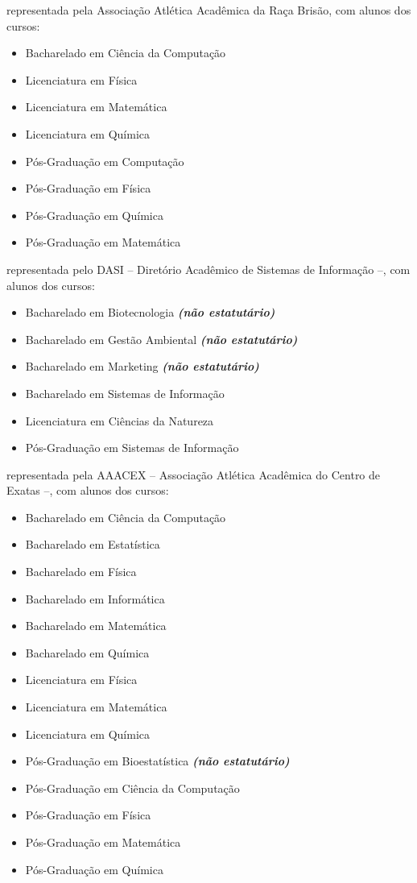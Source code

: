 \begin{article}
\begin{description}[noitemsep]
		\item[UFSCar - Sorocaba] representada pela Associação Atlética Acadêmica da Raça Brisão, com alunos dos cursos:
		\begin{itemize}[noitemsep]
			\item Bacharelado em Ciência da Computação
			\item Licenciatura em Física
			\item Licenciatura em Matemática
			\item Licenciatura em Química
			\item Pós-Graduação em Computação
			\item Pós-Graduação em Física
			\item Pós-Graduação em Química
			\item Pós-Graduação em Matemática
		\end{itemize}

		\item[USP Leste - EACH] representada pelo DASI -- Diretório Acadêmico de Sistemas de Informação --, com alunos dos cursos:
		\begin{itemize}[noitemsep]
			\item Bacharelado em Biotecnologia \textbf{\textit{(não estatutário)}}
			\item Bacharelado em Gestão Ambiental \textbf{\textit{(não estatutário)}}
			\item Bacharelado em Marketing \textbf{\textit{(não estatutário)}}
			\item Bacharelado em Sistemas de Informação
			\item Licenciatura em Ciências da Natureza
			\item Pós-Graduação em Sistemas de Informação
		\end{itemize}

		\item[UEM] representada pela AAACEX -- Associação Atlética Acadêmica do Centro de Exatas --, com alunos dos cursos:
		\begin{itemize}[noitemsep]
			\item Bacharelado em Ciência da Computação
			\item Bacharelado em Estatística
			\item Bacharelado em Física
			\item Bacharelado em Informática
			\item Bacharelado em Matemática
			\item Bacharelado em Química
			\item Licenciatura em Física
			\item Licenciatura em Matemática
			\item Licenciatura em Química
			\item Pós-Graduação em Bioestatística \textbf{\textit{(não estatutário)}}
			\item Pós-Graduação em Ciência da Computação
			\item Pós-Graduação em Física
			\item Pós-Graduação em Matemática
			\item Pós-Graduação em Química
		\end{itemize}
		

\end{description}
\end{article}
